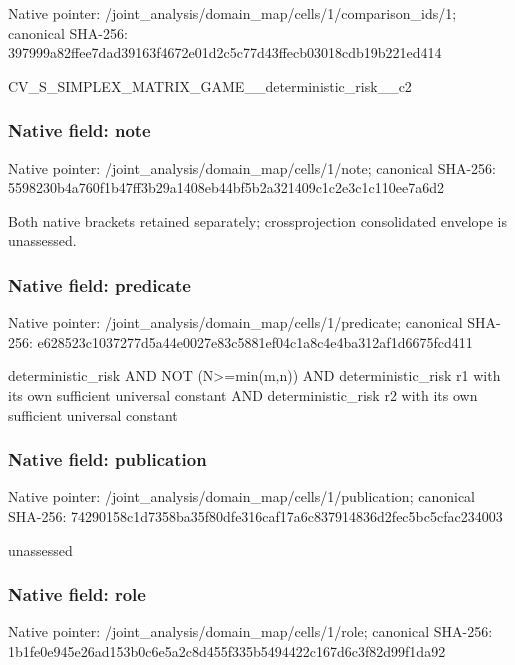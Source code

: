 \documentclass[10pt,a4paper]{article}
\begin{document}
Native pointer: /joint\_analysis/domain\_m\allowbreak{}ap/cells/1/comparison\_id\allowbreak{}s/1; canonical SHA-256: 397999a82ffee7dad39163f4\allowbreak{}672e01d2c5c77d43ffecb030\allowbreak{}18cdb19b221ed414


CV\_S\_SIMPLEX\_MATRIX\_GAME\allowbreak{}\_\_deterministic\_risk\_\_c2


\subsubsection{Native field: note}


Native pointer: /joint\_analysis/domain\_map/cells/1/note; canonical SHA-256: 5598230b4a760f1b47ff3b29\allowbreak{}a1408eb44bf5b2a321409c1c\allowbreak{}2e3c1c110ee7a6d2


Both native brackets retained separately; crossprojection consolidated envelope is unassessed.


\subsubsection{Native field: predicate}


Native pointer: /joint\_analysis/domain\_m\allowbreak{}ap/cells/1/predicate; canonical SHA-256: e628523c1037277d5a44e002\allowbreak{}7e83c5881ef04c1a8c4e4ba3\allowbreak{}12af1d6675fcd411


deterministic\_risk AND NOT (N>=min(m,n)) AND deterministic\_risk r1 with its own sufficient universal constant AND deterministic\_risk r2 with its own sufficient universal constant


\subsubsection{Native field: publication}


Native pointer: /joint\_analysis/domain\_m\allowbreak{}ap/cells/1/publication; canonical SHA-256: 74290158c1d7358ba35f80df\allowbreak{}e316caf17a6c837914836d2f\allowbreak{}ec5bc5cfac234003


unassessed


\subsubsection{Native field: role}


Native pointer: /joint\_analysis/domain\_map/cells/1/role; canonical SHA-256: 1b1fe0e945e26ad153b0c6e5\allowbreak{}a2c8d455f335b5494422c167\allowbreak{}d6c3f82d99f1da92
\end{document}
